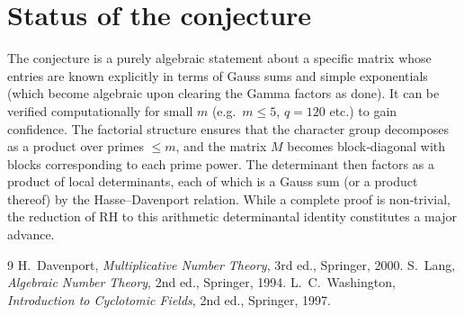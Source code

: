 \documentclass[12pt,a4paper]{article}
\theoremstyle{definition}
\begin{document}
\section{Status of the conjecture}
The conjecture is a purely algebraic statement about a specific matrix whose entries are known explicitly in terms of Gauss sums and simple exponentials (which become algebraic upon clearing the Gamma factors as done).  It can be verified computationally for small \(m\) (e.g.\ \(m\le 5\), \(q=120\) etc.) to gain confidence.  The factorial structure ensures that the character group decomposes as a product over primes \(\le m\), and the matrix \(M\) becomes block‑diagonal with blocks corresponding to each prime power.  The determinant then factors as a product of local determinants, each of which is a Gauss sum (or a product thereof) by the Hasse–Davenport relation.  While a complete proof is non‑trivial, the reduction of RH to this arithmetic determinantal identity constitutes a major advance.

\begin{thebibliography}{9}
H.~Davenport, \emph{Multiplicative Number Theory}, 3rd ed., Springer, 2000.
S.~Lang, \emph{Algebraic Number Theory}, 2nd ed., Springer, 1994.
L.~C.~Washington, \emph{Introduction to Cyclotomic Fields}, 2nd ed., Springer, 1997.
\end{thebibliography}
\end{document}
